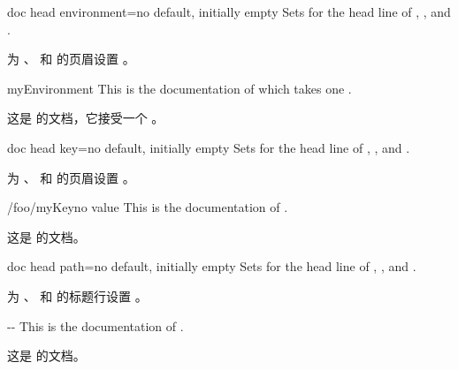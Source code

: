 
\begin{docTcbKey}{doc head environment}{=}{no default, initially empty}
Sets  for the head line of
, , and .

为 、 和  的页眉设置 。
\begin{dispExample}

\begin{docEnvironment*}{myEnvironment}{}
This is the documentation of  which
takes one .

这是  的文档，它接受一个 。
\end{docEnvironment*}
\end{dispExample}
\end{docTcbKey}

\begin{docTcbKey}{doc head key}{=}{no default, initially empty}
Sets  for the head line of
, , and .

为 、 和  的页眉设置 。
\begin{dispExample}

\begin{docKey}{/foo/myKey}{}{no value}
This is the documentation of .

这是  的文档。
\end{docKey}
\end{dispExample}
\end{docTcbKey}


\begin{docTcbKey}[][doc new=2019-09-18]{doc head path}{=}{no default, initially empty}
Sets  for the head line of
, , and .

为 、 和  的标题行设置 。
\begin{dispExample}

\begin{docPathOperation*}{-{}-}{}
This is the documentation of .

这是  的文档。
\end{docPathOperation*}
\end{dispExample}
\end{docTcbKey}


